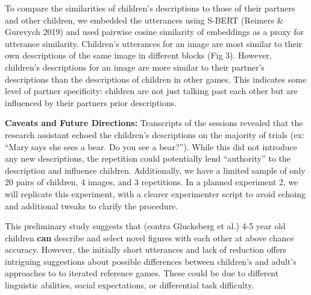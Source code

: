 \documentclass[11pt,a4paper]{article}
\begin{document}
To compare the similarities of children's descriptions to those of their partners and other children, we embedded the utterances using S-BERT (Reimers \& Gurevych 2019) and used pairwise cosine similarity of embeddings as a proxy for utterance similarity. Children's utterances for an image are most similar to their own descriptions of the same image in different blocks (Fig 3). However, children's descriptions for an image are more similar to their partner's descriptions than the descriptions of children in other games. This indicates some level of partner specificity: children are not just talking past each other but are influenced by their partners prior descriptions.

\bigskip

\textbf{Caveats and Future Directions:} 
Transcripts of the sessions revealed that the research assistant echoed the children's descriptions on the majority of trials (ex: ``Mary says she sees a bear. Do you see a bear?''). While this did not introduce any new descriptions, the repetition could potentially lend ``authority'' to the description and influence children. Additionally, we have a limited sample of only 20 pairs of children, 4 images, and 3 repetitions. In a planned experiment 2, we will replicate this experiment, with a clearer experimenter script to avoid echoing and additional tweaks to clarify the procedure. 

This preliminary study suggests that (contra Glucksberg et al.) 4-5 year old children \textbf{can} describe and select novel figures with each other at above chance accuracy. However, the initially short utterances and lack of reduction offers intriguing suggestions about possible differences between children's and adult's approaches to to iterated reference games. These could be due to different linguistic abilities, social expectations, or differential task difficulty. 
\newpage
\end{document}
